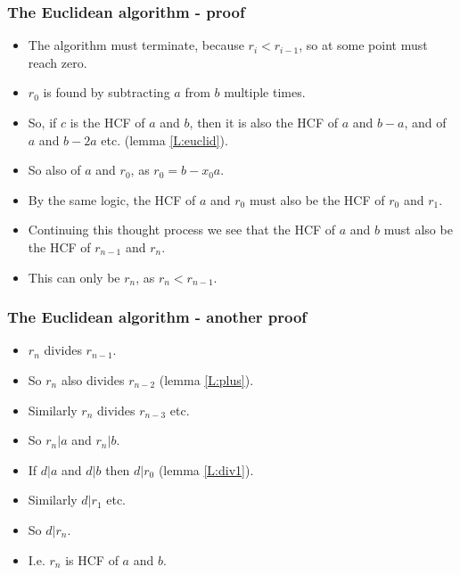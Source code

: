 \documentclass[handout]{beamer}
\begin{document}
\begin{frame}
\frametitle{The Euclidean algorithm - proof}
\begin{itemize}
\item The algorithm must terminate, because $r_i < r_{i-1}$, so at some point must reach zero. 
\vspace{0.2cm}
\item $r_0$ is found by subtracting $a$ from $b$ multiple times. 
\vspace{0.2cm}
\item So, if $c$ is the HCF of $a$ and $b$, then it is also the HCF of $a$ and $b-a$, and of $a$ and $b-2a$ etc. (lemma \ref{L:euclid}). 
\vspace{0.2cm}
\item So also of $a$ and $r_0$, as $r_0 = b- x_0a$. 
\vspace{0.2cm}
\item By the same logic, the HCF of $a$ and $r_0$ must also be the HCF of $r_0$ and $r_1$. 
\vspace{0.2cm}
\item Continuing this thought process we see that the HCF of $a$ and $b$ must also be the HCF of $r_{n-1}$ and $r_n$.
\vspace{0.2cm}
\item This can only be $r_n$, as $r_n<r_{n-1}$. 
\end{itemize}
\end{frame}

\begin{frame}
\frametitle{The Euclidean algorithm - another proof}
\begin{itemize}
\item $r_n$ divides $r_{n-1}$.
\vspace{0.2cm}
\item So $r_n$ also divides $r_{n-2}$ (lemma \ref{L:plus}).  
\vspace{0.2cm}
\item Similarly $r_n$ divides $r_{n-3}$ etc. 
\vspace{0.2cm}
\item So $r_n|a$ and $r_n|b$.
\vspace{0.2cm}
\item If $d|a$ and $d|b$ then $d|r_0$ (lemma \ref{L:div1}). 
\vspace{0.2cm}
\item Similarly $d|r_1$ etc.
\vspace{0.2cm}
\item So $d|r_n$.
\vspace{0.2cm}
\item I.e. $r_n$ is HCF of $a$ and $b$.
\end{itemize}
\end{frame}
\end{document}
